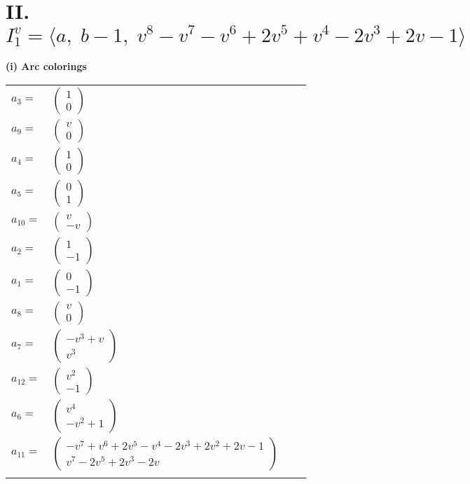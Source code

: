 \documentclass[1p]{elsarticle_modified}
\theoremstyle{definition}
\begin{document}
\centering \section*{II. $I^v_{1}= \langle a,\;b-1,\;v^8- v^7- v^6+2 v^5+v^4-2 v^3+2 v-1 \rangle$}
\flushleft \textbf{(i) Arc colorings}\\
\begin{tabular}{m{7pt} m{180pt} m{7pt} m{180pt} }
\flushright $a_{3}=$&$\begin{pmatrix}1\\0\end{pmatrix}$ \\
\flushright $a_{9}=$&$\begin{pmatrix}v\\0\end{pmatrix}$ \\
\flushright $a_{4}=$&$\begin{pmatrix}1\\0\end{pmatrix}$ \\
\flushright $a_{5}=$&$\begin{pmatrix}0\\1\end{pmatrix}$ \\
\flushright $a_{10}=$&$\begin{pmatrix}v\\- v\end{pmatrix}$ \\
\flushright $a_{2}=$&$\begin{pmatrix}1\\-1\end{pmatrix}$ \\
\flushright $a_{1}=$&$\begin{pmatrix}0\\-1\end{pmatrix}$ \\
\flushright $a_{8}=$&$\begin{pmatrix}v\\0\end{pmatrix}$ \\
\flushright $a_{7}=$&$\begin{pmatrix}- v^3+v\\v^3\end{pmatrix}$ \\
\flushright $a_{12}=$&$\begin{pmatrix}v^2\\-1\end{pmatrix}$ \\
\flushright $a_{6}=$&$\begin{pmatrix}v^4\\- v^2+1\end{pmatrix}$ \\
\flushright $a_{11}=$&$\begin{pmatrix}- v^7+v^6+2 v^5- v^4-2 v^3+2 v^2+2 v-1\\v^7-2 v^5+2 v^3-2 v\end{pmatrix}$\\&\end{tabular}
\end{document}
